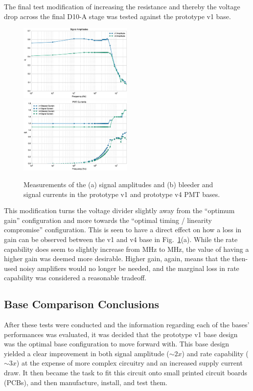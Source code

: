 The final test modification of increasing the resistance and thereby the voltage drop across the final D10-A stage was tested against the prototype v1 base.

\begin{figure}[h]
	\centerline{
		\mbox{\includegraphics[width=0.5\textwidth]{figures/pmtupgrade/Test_v4_Amp.eps} \includegraphics[width=0.5\textwidth]{figures/pmtupgrade/Test_v4_Current.eps}}}
	\caption{Measurements of the (a) signal amplitudes and (b) bleeder and signal currents in the prototype v1 and prototype v4 PMT bases.}
	\label{fig:test-v4}
\end{figure}

This modification turns the voltage divider slightly away from the ``optimum gain'' configuration and more towards the ``optimal timing / linearity compromise'' configuration. This is seen to have a direct effect on how a loss in gain can be observed between the v1 and v4 base in Fig.~\ref{fig:test-v4}(a). While the rate capability does seem to slightly increase from \unit[4]{MHz} to \unit[5]{MHz}, the value of having a higher gain was deemed more desirable. Higher gain, again, means that the then-used noisy amplifiers would no longer be needed, and the marginal loss in rate capability was considered a reasonable tradeoff.

\subsection{Base Comparison Conclusions}

After these tests were conducted and the information regarding each of the bases' performances was evaluated, it was decided that the prototype v1 base design was the optimal base configuration to move forward with. This base design yielded a clear improvement in both signal amplitude ($\sim2x$) and rate capability ($\sim3x$) at the expense of more complex circuitry and an increased supply current draw. It then became the task to fit this circuit onto small printed circuit boards (PCBs), and then manufacture, install, and test them.

